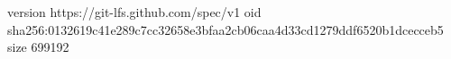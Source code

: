 version https://git-lfs.github.com/spec/v1
oid sha256:0132619c41e289c7cc32658e3bfaa2cb06caa4d33cd1279ddf6520b1dcecceb5
size 699192

